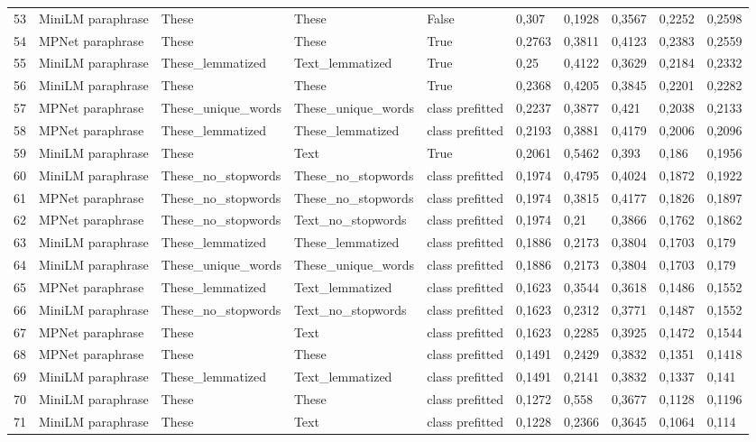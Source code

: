 \begin{tabular}{llllllllll}
53 & MiniLM paraphrase & These & These & False & 0,307 & 0,1928 & 0,3567 & 0,2252 & 0,2598 \\
54 & MPNet paraphrase & These & These & True & 0,2763 & 0,3811 & 0,4123 & 0,2383 & 0,2559 \\
55 & MiniLM paraphrase & These_lemmatized & Text_lemmatized & True & 0,25 & 0,4122 & 0,3629 & 0,2184 & 0,2332 \\
56 & MiniLM paraphrase & These & These & True & 0,2368 & 0,4205 & 0,3845 & 0,2201 & 0,2282 \\
57 & MPNet paraphrase & These_unique_words & These_unique_words & class prefitted & 0,2237 & 0,3877 & 0,421 & 0,2038 & 0,2133 \\
58 & MPNet paraphrase & These_lemmatized & These_lemmatized & class prefitted & 0,2193 & 0,3881 & 0,4179 & 0,2006 & 0,2096 \\
59 & MiniLM paraphrase & These & Text & True & 0,2061 & 0,5462 & 0,393 & 0,186 & 0,1956 \\
60 & MiniLM paraphrase & These_no_stopwords & These_no_stopwords & class prefitted & 0,1974 & 0,4795 & 0,4024 & 0,1872 & 0,1922 \\
61 & MPNet paraphrase & These_no_stopwords & These_no_stopwords & class prefitted & 0,1974 & 0,3815 & 0,4177 & 0,1826 & 0,1897 \\
62 & MPNet paraphrase & These_no_stopwords & Text_no_stopwords & class prefitted & 0,1974 & 0,21 & 0,3866 & 0,1762 & 0,1862 \\
63 & MiniLM paraphrase & These_lemmatized & These_lemmatized & class prefitted & 0,1886 & 0,2173 & 0,3804 & 0,1703 & 0,179 \\
64 & MiniLM paraphrase & These_unique_words & These_unique_words & class prefitted & 0,1886 & 0,2173 & 0,3804 & 0,1703 & 0,179 \\
65 & MPNet paraphrase & These_lemmatized & Text_lemmatized & class prefitted & 0,1623 & 0,3544 & 0,3618 & 0,1486 & 0,1552 \\
66 & MiniLM paraphrase & These_no_stopwords & Text_no_stopwords & class prefitted & 0,1623 & 0,2312 & 0,3771 & 0,1487 & 0,1552 \\
67 & MPNet paraphrase & These & Text & class prefitted & 0,1623 & 0,2285 & 0,3925 & 0,1472 & 0,1544 \\
68 & MPNet paraphrase & These & These & class prefitted & 0,1491 & 0,2429 & 0,3832 & 0,1351 & 0,1418 \\
69 & MiniLM paraphrase & These_lemmatized & Text_lemmatized & class prefitted & 0,1491 & 0,2141 & 0,3832 & 0,1337 & 0,141 \\
70 & MiniLM paraphrase & These & These & class prefitted & 0,1272 & 0,558 & 0,3677 & 0,1128 & 0,1196 \\
71 & MiniLM paraphrase & These & Text & class prefitted & 0,1228 & 0,2366 & 0,3645 & 0,1064 & 0,114 \\
\bottomrule
\end{tabular}
